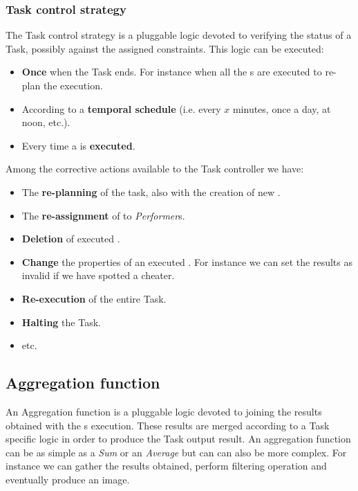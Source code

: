 \subsubsection{Task control strategy}
The Task control strategy is a pluggable logic devoted to verifying the status of
a Task, possibly against the assigned constraints. This logic can be executed:
\begin{itemize}
    \item \textbf{Once} when the Task ends. For instance when all the \utask{}s
    are executed to re-plan the execution.

    \item According to a \textbf{temporal schedule} (i.e. every $x$ minutes,
    once a day, at noon, etc.).

    \item Every time a \utask{} is \textbf{executed}.
\end{itemize}
\noindent Among the corrective actions available to the Task controller we have: 
\begin{itemize}
    \item The \textbf{re-planning} of the task, also with the creation of new
    \utask{}.

    \item The \textbf{re-assignment} of \utask{} to \emph{Performer}s.

    \item \textbf{Deletion} of executed \utask{}.

    \item \textbf{Change} the properties of an executed \utask{}. For instance
    we can set the results as invalid if we have spotted a cheater.

    \item \textbf{Re-execution} of the entire Task.

    \item \textbf{Halting} the Task.

    \item etc.
\end{itemize}



\subsection{Aggregation function}
An Aggregation function is a pluggable logic devoted to joining the results
obtained with the \utask{}s execution. These results are merged according to a
Task specific logic in order to produce the Task output result. An aggregation
function can be as simple as a \emph{Sum} or an \emph{Average} but can can also
be more complex. For instance we can gather the results obtained, perform
filtering operation and eventually produce an image.


